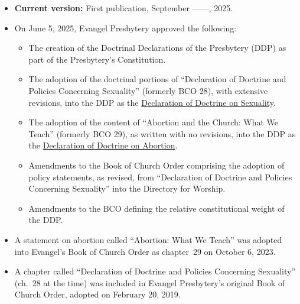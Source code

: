 \documentclass[
]{book}
\providecommand{\tightlist}{%
  \setlength{\itemsep}{0pt}\setlength{\parskip}{0pt}}
\begin{document}
\begin{itemize}
\tightlist
\item
  \textbf{Current version:} First publication, September ------, 2025.
\item
  On June 5, 2025, Evangel Presbytery approved the following:

  \begin{itemize}
  \tightlist
  \item
    The creation of the Doctrinal Declarations of the Presbytery (DDP) as part of the Presbytery's Constitution.
  \item
    The adoption of the doctrinal portions of ``Declaration of Doctrine and Policies Concerning Sexuality'' (formerly BCO 28), with extensive revisions, into the DDP as the \protect\hyperlink{declaration-of-doctrine-on-sexuality}{Declaration of Doctrine on Sexuality}.
  \item
    The adoption of the content of ``Abortion and the Church: What We Teach'' (formerly BCO 29), as written with no revisions, into the DDP as the \protect\hyperlink{declaration-of-doctrine-on-abortion}{Declaration of Doctrine on Abortion}.
  \item
    Amendments to the Book of Church Order comprising the adoption of policy statements, as revised, from ``Declaration of Doctrine and Policies Concerning Sexuality'' into the Directory for Worship.
  \item
    Amendments to the BCO defining the relative constitutional weight of the DDP.
  \end{itemize}
\item
  A statement on abortion called ``Abortion: What We Teach'' was adopted into Evangel's Book of Church Order as chapter~29 on October 6, 2023.
\item
  A chapter called ``Declaration of Doctrine and Policies Concerning Sexuality'' (ch.~28 at the time) was included in Evangel Presbytery's original Book of Church Order, adopted on February 20, 2019.
\end{itemize}
\end{document}
